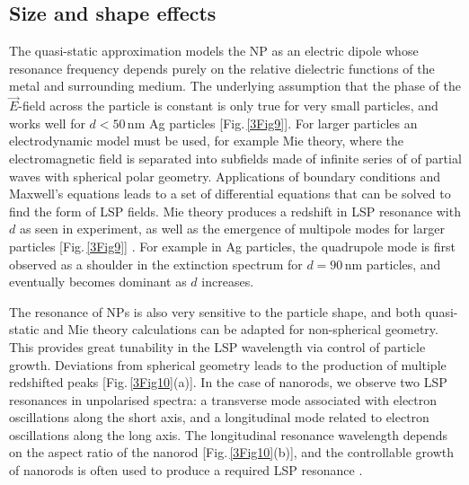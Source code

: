 \subsection{Size and shape effects}
The quasi-static approximation models the NP as an electric dipole whose resonance frequency depends purely on the relative dielectric functions of the metal and surrounding medium. The underlying assumption that the phase of the $\vec{E}$-field across the particle is constant is only true for very small particles, and works well for $d<50$\,nm Ag particles [Fig.\,\ref{3Fig9}]. For larger particles an electrodynamic model must be used, for example Mie theory, where the electromagnetic field is separated into subfields made of infinite series of of partial waves with spherical polar geometry. Applications of boundary conditions and Maxwell's equations leads to a set of differential equations that can be solved to find the form of LSP fields. Mie theory produces a redshift in LSP resonance with $d$ as seen in experiment, as well as the emergence of multipole modes for larger particles [Fig.\,\ref{3Fig9}] \cite{Maier2007, Born1999}. For example in Ag particles, the quadrupole mode is first observed as a shoulder in the extinction spectrum for $d=90$\,nm particles, and eventually becomes dominant as $d$ increases.

The resonance of NPs is also very sensitive to the particle shape, and both quasi-static and Mie theory calculations can be adapted for non-spherical geometry. This provides great tunability in the LSP wavelength via control of particle growth. Deviations from spherical geometry leads to the production of multiple redshifted peaks [Fig.\,\ref{3Fig10}(a)]. In the case of nanorods, we observe two LSP resonances in unpolarised spectra: a transverse mode associated with electron oscillations along the short axis, and a longitudinal mode related to electron oscillations along the long axis. The longitudinal resonance wavelength depends on the aspect ratio of the nanorod [Fig.\,\ref{3Fig10}(b)], and the controllable growth of nanorods is often used to produce a required LSP resonance \cite{Wiley2006, Wiley2007, Chen2013}.


